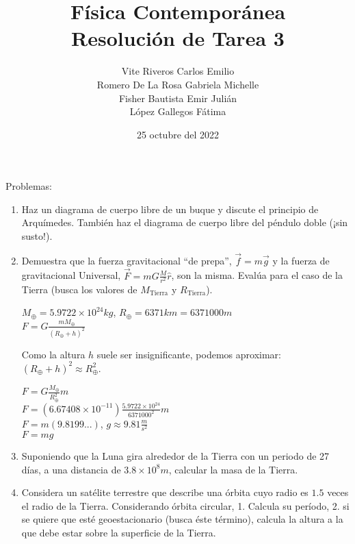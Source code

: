 \documentclass[10pt, a4paper]{article}
\title{Física Contemporánea\\Resolución de Tarea 3}
\author{Vite Riveros Carlos Emilio\\ Romero De La Rosa Gabriela Michelle\\ 
        Fisher Bautista Emir Julián\\ López Gallegos Fátima}
\date{25 octubre del 2022}
\begin{document}
    \maketitle

    Problemas:
    \begin{enumerate}
        \item Haz un diagrama de cuerpo libre de un buque y discute el principio de
        Arquímedes. También haz el diagrama de cuerpo libre del péndulo doble
        (¡sin susto!).

        \item Demuestra que la fuerza gravitacional “de prepa”, $\vec{f}=m\vec{g}$ y la 
        fuerza de gravitacional Universal, $\vec{F}=mG\frac{M}{r^2}\hat{r}$, son la misma. 
        Evalúa para el caso de la Tierra (busca los valores de $M_{\text{Tierra}}$ y $R_{\text{Tierra}}$).

        \begin{center}
            $M_\oplus= 5.9722 \times 10^{24}\si{kg}$, $R_\oplus= 6371 \si{km}=6371000\si{m}$\\
            $F = G\frac{m M_\oplus}{(R_\oplus+h)^2}$

            Como la altura $h$ suele ser insignificante, podemos aproximar:\\
             $(R_\oplus+h)^2\approx R_\oplus^2$.

            $F = G\frac{M_\oplus}{R_\oplus^2}m$\\
            $F = (6.67408\times 10^{-11})\frac{5.9722\times 10^{24}}{6371000^2}m$\\
            $F = m(9.8199...)$, $\si{g}\approx9.81\frac{\si{m}}{\si{s^2}}$\\
            $F = mg$

        \end{center}

        \item Suponiendo que la Luna gira alrededor de la Tierra con un periodo de 27
        días, a una distancia de $3.8 \times 10^8 \si{m}$, calcular la masa de la Tierra.

        \item Considera un satélite terrestre que describe una órbita cuyo radio es $1.5$
        veces el radio de la Tierra. Considerando órbita circular, 1. Calcula su
        período, 2. si se quiere que esté geoestacionario (busca éste término), calcula
        la altura a la que debe estar sobre la superficie de la Tierra.
        

\end{enumerate}
\end{document}
